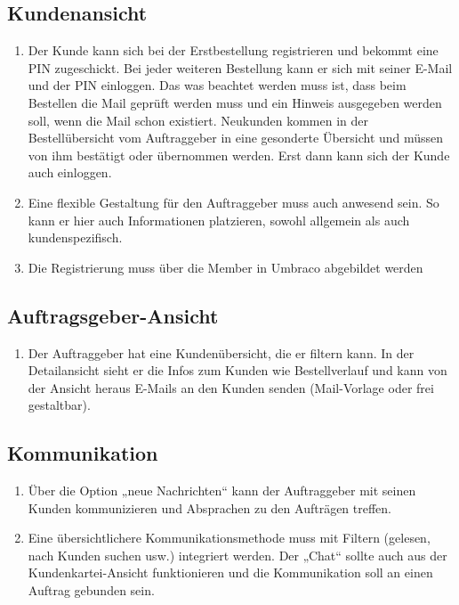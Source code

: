 \subsection{Kundenansicht}

\begin{enumerate}
	\item Der Kunde kann sich bei der Erstbestellung registrieren und bekommt eine PIN zugeschickt. Bei jeder weiteren Bestellung kann er sich mit seiner E-Mail und der PIN einloggen. Das was beachtet werden muss ist, dass beim Bestellen die Mail geprüft werden muss und ein Hinweis ausgegeben werden soll, wenn die Mail schon existiert. Neukunden kommen in der Bestellübersicht vom Auftraggeber in eine gesonderte Übersicht und müssen von ihm bestätigt oder übernommen werden. Erst dann kann sich der Kunde auch einloggen.
	\item Eine flexible Gestaltung für den Auftraggeber muss auch anwesend sein. So kann er hier auch Informationen platzieren, sowohl allgemein als auch kundenspezifisch.
	\item Die Registrierung muss über die Member in Umbraco abgebildet werden
\end{enumerate} 

\subsection{Auftragsgeber-Ansicht}

\begin{enumerate}
\item Der Auftraggeber hat eine Kundenübersicht, die er filtern kann. In der Detailansicht sieht er die Infos zum Kunden wie Bestellverlauf und kann von der Ansicht heraus E-Mails an den Kunden senden (Mail-Vorlage oder frei gestaltbar).
\end{enumerate} 

\subsection{Kommunikation}

\begin{enumerate}
	\item Über die Option „neue Nachrichten“ kann der Auftraggeber mit seinen Kunden kommunizieren und Absprachen zu den Aufträgen treffen.
	\item Eine übersichtlichere Kommunikationsmethode muss mit Filtern (gelesen, nach Kunden suchen usw.) integriert werden. Der „Chat“ sollte auch aus der Kundenkartei-Ansicht funktionieren und die Kommunikation soll an einen Auftrag gebunden sein.
\end{enumerate} 


